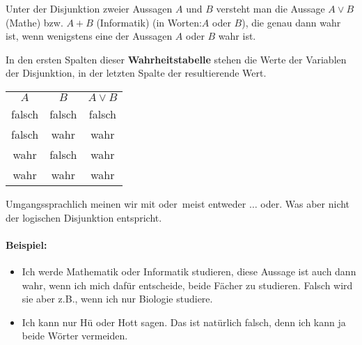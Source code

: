 \begin{definition}[Disjunktion]
Unter der Disjunktion zweier Aussagen $A$ und $B$ versteht man die Aussage $A \lor B$ (Mathe) bzw. $A + B$ (Informatik) (in Worten:\glqq $A$ oder $B$\grqq ), die genau dann wahr ist, wenn wenigstens eine der Aussagen $A$ oder $B$ wahr ist.
\end{definition}
In den ersten Spalten dieser \textbf{Wahrheitstabelle} stehen die Werte der Variablen der Disjunktion, in der letzten Spalte der resultierende Wert.
\begin{center}
\begin{tabular}{c|c||c}
$A$& $B$  &  $A \lor B$  \\ 
 \cellcolor{ared}falsch & \cellcolor{ared} falsch & \cellcolor{ared}falsch   \\ 
 \cellcolor{ared}falsch & \cellcolor{agreen}wahr & \cellcolor{agreen}wahr  \\ 
 \cellcolor{agreen}wahr & \cellcolor{ared} falsch & \cellcolor{agreen}wahr   \\ 
\cellcolor{agreen}wahr & \cellcolor{agreen}wahr & \cellcolor{agreen}wahr  \\ 
\hline
\end{tabular}
\end{center}
\begin{warning}
	Umgangssprachlich meinen wir mit \glqq oder\grqq \ meist \glqq entweder $\ldots$ oder\grqq . Was aber nicht der logischen Disjunktion entspricht.
\end{warning}

\paragraph*{Beispiel:}
\begin{itemize}
	\item \glqq Ich werde Mathematik oder Informatik studieren\grqq , diese Aussage ist auch dann wahr, wenn ich mich dafür entscheide, beide Fächer zu studieren. Falsch wird sie aber z.B., wenn ich nur Biologie studiere.
	\item \glqq Ich kann nur Hü oder Hott sagen\grqq . Das ist natürlich falsch, denn ich kann ja beide Wörter vermeiden.
\end{itemize}

